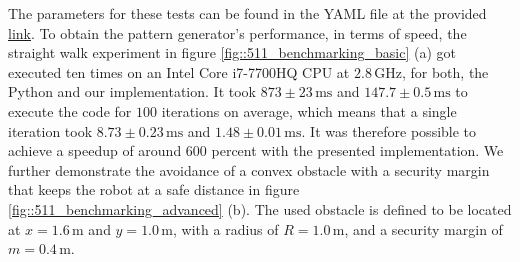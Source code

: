 The parameters for these tests can be found in the YAML file at the provided \href{https://github.com/mhubii/nmpc_pattern_generator/blob/719fde0bb73925923de85cbf379c5523e075dfeb/libs/pattern_generator/configs_hrp2.yaml#L1}{\underline{link}}. To obtain the pattern generator's performance, in terms of speed, the straight walk experiment in figure \ref{fig::511_benchmarking_basic} (a) got executed ten times on an Intel Core i7-7700HQ CPU at $2.8\,\text{GHz}$, for both, the Python and our implementation. It took $873\pm23\,\text{ms}$ and $147.7\pm0.5\,\text{ms}$ to execute the code for $100$ iterations on average, which means that a single iteration took $8.73\pm0.23\,\text{ms}$ and $1.48\pm0.01\,\text{ms}$. It was therefore possible to achieve a speedup of around $600$ percent with the presented implementation. We further demonstrate the avoidance of a convex obstacle with a security margin that keeps the robot at a safe distance in figure \ref{fig::511_benchmarking_advanced} (b). The used obstacle is defined to be located at $x=1.6\,\text{m}$ and $y=1.0\,\text{m}$, with a radius of $R=1.0\,\text{m}$, and a security margin of $m=0.4\,\text{m}$.
